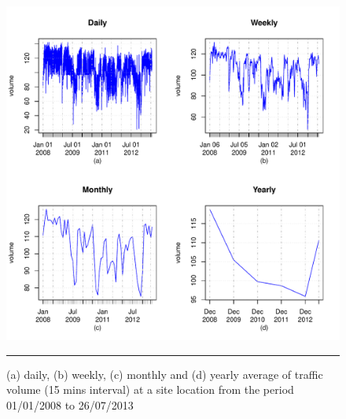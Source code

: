 \begin{figure}[htbp]
  \centering
    \includegraphics[width=\textwidth,height=\textheight,keepaspectratio]{Figures/averages.pdf}
    \rule{35em}{0.5pt}
  \caption[Average Traffic Volume]{(a) daily, (b) weekly, (c) monthly and (d) yearly average of traffic volume (15 mins interval) at a site location from the period 01/01/2008 to 26/07/2013}
  \label{fig:Average Traffic Volume}
\end{figure}
